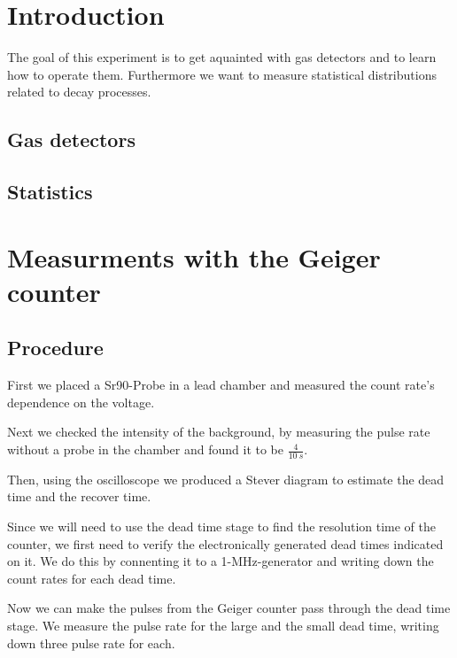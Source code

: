 \tableofcontents
\newpage
\listoffigures

\listoftables

\skippage

\setcounter{page}{1}
\restoregeometry
\thispagestyle{fancy}


\section{Introduction}

The goal of this experiment is to get aquainted with gas detectors and to learn how to operate them. Furthermore we want to measure statistical distributions related to decay processes.

\subsection{Gas detectors}

\subsection{Statistics}

\section{Measurments with the Geiger counter}

\subsection{Procedure}

First we placed a Sr90-Probe in a lead chamber and measured the count rate's dependence on the voltage.

Next we checked the intensity of the background, by measuring the pulse rate without a probe in the chamber and found it to be $\frac{4}{\SI{10}{s}}$.

Then, using the oscilloscope we produced a Stever diagram to estimate the dead time and the recover time.

Since we will need to use the dead time stage to find the resolution time of the counter, we first need to verify the electronically generated dead times indicated on it. We do this by connenting it to a 1-MHz-generator and writing down the count rates for each dead time.

Now we can make the pulses from the Geiger counter pass through the dead time stage. We measure the pulse rate for the large and the small dead time, writing down three pulse rate for each.

